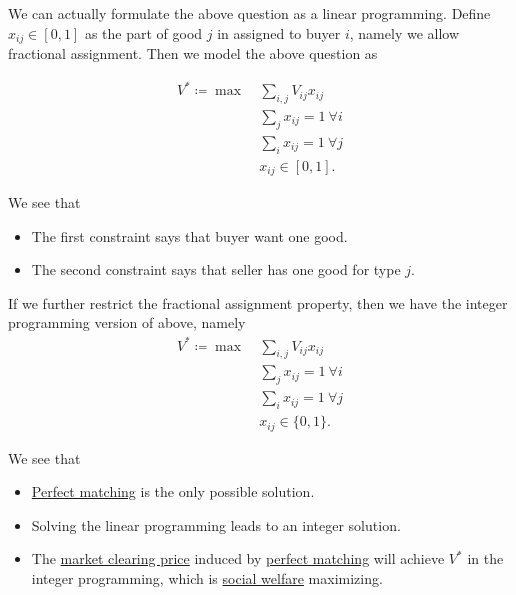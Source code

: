 We can actually formulate the above question as a linear programming. Define \(x_{ij} \in [0, 1]\) as the part of
good \(j\) in assigned to buyer \(i\), namely we allow fractional assignment. Then we model the above question as

\begin{align*}
	V^{\ast} \coloneqq \max~ & \sum\limits_{i, j}V_{ij}x_{ij}       \\
	                         & \sum\limits_{j}x_{ij} = 1\ \forall i \\
	                         & \sum\limits_{i}x_{ij} = 1\ \forall j \\
	                         & x_{ij}\in[0, 1].
\end{align*}
\begin{intuition}
	We see that
	\begin{itemize}
		\item The first constraint says that buyer want one good.
		\item The second constraint says that seller has one good for type \(j\).
	\end{itemize}
\end{intuition}

If we further restrict the fractional assignment property, then we have the integer programming version of above, namely
\begin{align*}
	V^{\ast} \coloneqq \max~ & \sum\limits_{i, j}V_{ij}x_{ij}       \\
	                         & \sum\limits_{j}x_{ij} = 1\ \forall i \\
	                         & \sum\limits_{i}x_{ij} = 1\ \forall j \\
	                         & x_{ij}\in\{0, 1\}.
\end{align*}

\begin{remark}
	We see that
	\begin{itemize}
		\item \hyperref[def:perfect-matching]{Perfect matching} is the only possible solution.
		\item Solving the linear programming leads to an integer solution.
		\item The \hyperref[note:market-clearing-prices]{market clearing price} induced by \hyperref[def:perfect-matching]{perfect matching}
		      will achieve \(V^{\ast}\) in the integer programming, which is \hyperref[def:social-welfare]{social welfare} maximizing.
	\end{itemize}
\end{remark}

